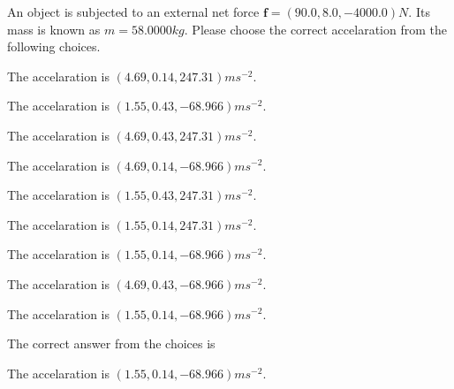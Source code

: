 \documentclass[12pt]{article}
\begin{document}
 
 
An object is subjected to an external net force $\mathbf{f}=
(90.0 , 8.0 , -4000.0) N$.
Its mass is known as $m= %
58.0000 kg$. Please choose the
correct accelaration from the following choices.
 
 
 
The accelaration is $  %
(
4.69,
0.14,
247.31)
ms^{-2} $.
 
 
The accelaration is $  %
(
1.55,
0.43,
-68.966)
ms^{-2} $.
 
 
The accelaration is $  %
(
4.69,
0.43,
247.31)
ms^{-2} $.
 
 
The accelaration is $  %
(
4.69,
0.14,
-68.966)
ms^{-2} $.
 
 
The accelaration is $  %
(
1.55,
0.43,
247.31)
ms^{-2} $.
 
 
The accelaration is $  %
(
1.55,
0.14,
247.31)
ms^{-2} $.
 
 
The accelaration is $  %
(
1.55,
0.14,
-68.966)
ms^{-2} $.
 
 
The accelaration is $  %
(
4.69,
0.43,
-68.966)
ms^{-2} $.
 
 
\noindent{}
 
 
The accelaration is $  %
(
1.55,
0.14,
-68.966)
ms^{-2} $.
 
 
\noindent{}
 
 
 
 
 
\noindent{}
 
 

The correct answer from the choices is


The accelaration is $  %
(
1.55,
0.14,
-68.966)
ms^{-2} $.
 
 
 
\noindent{}
 
 

 
 
 
\noindent{}
 
\end{document}
